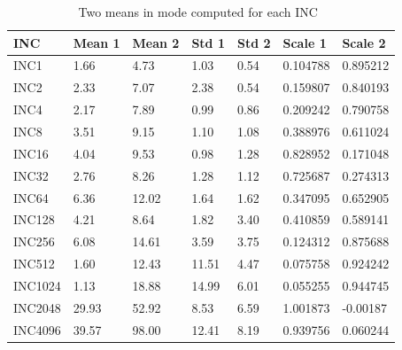 \begin{table}[h]
\begin{center}
\begin{tabular}{|l|l|l|l|l|l|l|} \hline
INC        & Mean 1 & Mean 2 & Std 1 & Std 2 & Scale 1 & Scale 2\\ \hline
INC1      & 1.66  & 4.73 & 1.03 & 0.54 & 0.104788 & 0.895212\\ \hline
INC2      & 2.33  & 7.07 & 2.38 & 0.54 & 0.159807 & 0.840193\\ \hline
INC4      & 2.17  & 7.89 & 0.99 & 0.86 & 0.209242 & 0.790758\\ \hline
INC8      & 3.51  & 9.15 & 1.10 & 1.08 & 0.388976 & 0.611024\\ \hline
INC16    & 4.04  & 9.53 & 0.98 & 1.28 & 0.828952 & 0.171048\\ \hline
INC32    & 2.76  & 8.26 & 1.28 & 1.12 & 0.725687 & 0.274313\\ \hline
INC64    & 6.36  & 12.02 & 1.64 & 1.62 &  0.347095 & 0.652905\\ \hline
INC128  & 4.21  & 8.64 & 1.82 & 3.40 & 0.410859 & 0.589141\\ \hline
INC256  & 6.08  & 14.61  & 3.59 & 3.75 & 0.124312 & 0.875688\\ \hline
INC512  & 1.60  & 12.43   & 11.51 & 4.47 & 0.075758 & 0.924242\\ \hline
INC1024 & 1.13  & 18.88  & 14.99 & 6.01 & 0.055255 & 0.944745\\ \hline
INC2048 & 29.93 & 52.92 & 8.53 & 6.59 & 1.001873 & -0.00187\\ \hline
INC4096 & 39.57 & 98.00 & 12.41 & 8.19 & 0.939756 & 0.060244\\ \hline
\end{tabular}
\end{center}
\vspace{-.2in}
\caption{Two means in mode computed for each INC~\label{tab:binormal_fit}}
\end{table}

\clearpage
\pagebreak

